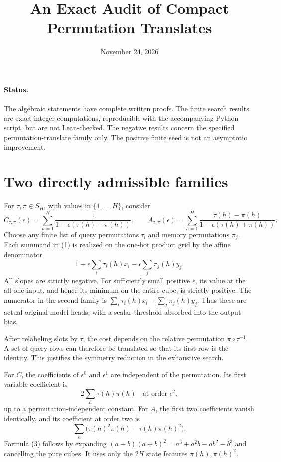 \documentclass[11pt]{article}
\begin{document}
\title{An Exact Audit of Compact Permutation Translates}
\author{}
\date{November 24, 2026}
\maketitle

\paragraph{Status.}
The algebraic statements have complete written proofs. The finite
search results are exact integer computations, reproducible with the
accompanying Python script, but are not Lean-checked. The negative
results concern the specified permutation-translate family only.
The positive finite seed is not an asymptotic improvement.

\section{Two directly admissible families}
For $\tau,\pi\in S_H$, with values in $\{1,\ldots,H\}$, consider
\[
 C_{\tau,\pi}(\epsilon)
       =\sum_{h=1}^H\frac1{1-\epsilon(\tau(h)+\pi(h))},
 \qquad
 A_{\tau,\pi}(\epsilon)
       =\sum_{h=1}^H
           \frac{\tau(h)-\pi(h)}{1-\epsilon(\tau(h)+\pi(h))}.
                                                        \tag{1}
\]
Choose any finite list of query permutations $\tau_i$ and memory
permutations $\pi_j$. Each summand in (1) is realized on the
one-hot product grid by the affine denominator
\[
 1-\epsilon\sum_i\tau_i(h)x_i
   -\epsilon\sum_j\pi_j(h)y_j.
\]
All slopes are strictly negative. For sufficiently small positive
$\epsilon$, its value at the all-one input, and hence its minimum
on the entire cube, is strictly positive. The numerator in the
second family is $\sum_i\tau_i(h)x_i-\sum_j\pi_j(h)y_j$.
Thus these are actual original-model heads, with a scalar threshold
absorbed into the output bias.

After relabeling slots by $\tau$, the cost depends on the relative
permutation $\pi\circ\tau^{-1}$. A set of query rows can therefore
be translated so that its first row is the identity. This justifies
the symmetry reduction in the exhaustive search.

For $C$, the coefficients of $\epsilon^0$ and $\epsilon^1$ are
independent of the permutation. Its first variable coefficient is
\[
             2\sum_h\tau(h)\pi(h)\quad
             \text{at order }\epsilon^2,              \tag{2}
\]
up to a permutation-independent constant. For $A$, the first two
coefficients vanish identically, and its coefficient at order two is
\[
       \sum_h\bigl(\tau(h)^2\pi(h)-\tau(h)\pi(h)^2\bigr).
                                                        \tag{3}
\]
Formula (3) follows by expanding
$(a-b)(a+b)^2=a^3+a^2b-ab^2-b^3$ and cancelling the pure cubes.
It uses only the $2H$ state features $\pi(h),\pi(h)^2$.
\end{document}
